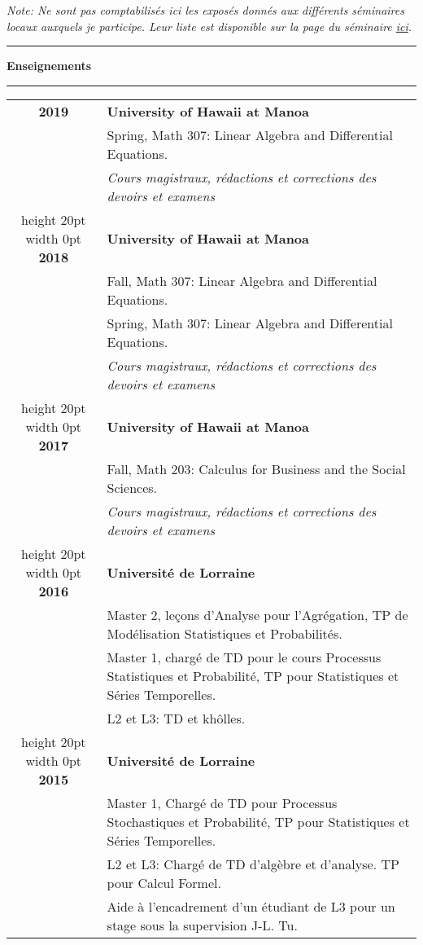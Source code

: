 \documentclass[a4paper,11pt]{article}
\newcommand\espace{\vrule height 20pt width 0pt}
\newcommand{\titre}[1]{%
	\begin{center}
	\bigskip
	\rule{\textwidth}{1pt}
	\par\vspace{0.1cm}
        \textbf{\large #1}
	\par\rule{\textwidth}{1pt}
	\end{center}
	\bigskip
	}
\begin{document}
\vfill
\textit{Note: Ne sont pas comptabilis\'es ici les expos\'es donn\'es aux diff\'erents s\'eminaires locaux auxquels je participe. Leur liste est disponible sur la page du s\'eminaire \href{https://clementstuff.wordpress.com/noncommutative-geometry/}{ici}.}
\newpage
\titre{Enseignements}
\begin{tabular}{cp{}}

\textbf{ 2019 } 	& \textbf{University of Hawaii at Manoa}\\
					& Spring, Math 307: Linear Algebra and Differential Equations.\\
					& \textit{Cours magistraux, r\'edactions et corrections des devoirs et examens}\\
\espace
\textbf{ 2018 } 	& \textbf{University of Hawaii at Manoa}\\
					& Fall, Math 307: Linear Algebra and Differential Equations.\\
					& Spring, Math 307: Linear Algebra and Differential Equations.\\
					& \textit{Cours magistraux, r\'edactions et corrections des devoirs et examens}\\
\espace
\textbf{ 2017 } 	& \textbf{University of Hawaii at Manoa}\\
					& Fall, Math 203: Calculus for Business and the Social Sciences.\\
					& \textit{Cours magistraux, r\'edactions et corrections des devoirs et examens}\\
\espace
\textbf{ 2016 } 	& \textbf{Universit\'e de Lorraine}\\
					&	Master 2, le\c{c}ons d'Analyse pour l'Agrégation, TP de Mod\'elisation Statistiques et Probabilit\'es.\\
					&	Master 1,	charg\'e de TD pour le cours Processus Statistiques et Probabilit\'e, TP pour Statistiques et S\'eries Temporelles. \\
					&	L2 et L3: TD et kh\^{o}lles. \\
\espace
\textbf{ 2015 } 	& \textbf{Universit\'e de Lorraine}\\
			 		& Master 1, Charg\'e de TD pour Processus Stochastiques et Probabilit\'e, TP pour Statistiques et S\'eries Temporelles.\\
					& L2 et L3: Charg\'e de TD d'alg\`ebre et d'analyse. TP pour Calcul Formel.\\ 
					& Aide \`a l'encadrement d'un \'etudiant de L3 pour un stage sous la supervision J-L. Tu.\\   

\end{tabular}
\end{document}
